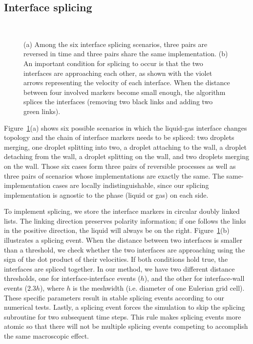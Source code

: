 \documentclass[%
 aip,
 amsmath,amssymb,
 reprint,
 floatfix
]{revtex4-1}
\begin{document}
\subsection{Interface splicing} \label{subsec:splice}
\begin{figure}
\centering
{}\quad
{}\\
\caption{\footnotesize{(a) Among the six interface splicing scenarios, three pairs are reversed in time and three pairs share the same implementation. (b) An important condition for splicing to occur is that the two interfaces are approaching each other, as shown with the violet arrows representing the velocity of each interface. When the distance between four involved markers become small enough, the algorithm splices the interfaces (removing two black links and adding two green links).}}
\label{fig:splice}
\end{figure}
Figure~\ref{fig:splice}(a) shows six possible scenarios in which the liquid-gas interface changes topology and the chain of interface markers needs to be spliced: two droplets merging, one droplet splitting into two, a droplet attaching to the wall, a droplet detaching from the wall, a droplet splitting on the wall, and two droplets merging on the wall. Those six cases form three pairs of reversible processes as well as three pairs of scenarios whose implementations are exactly the same. The same-implementation cases are locally indistinguishable, since our splicing implementation is agnostic to the phase (liquid or gas) on each side. 

To implement splicing, we store the interface markers in circular doubly linked lists. The linking direction preserves polarity information; if one follows the links in the positive direction, the liquid will always be on the right. Figure~\ref{fig:splice}(b) illustrates a splicing event. When the distance between two interfaces is smaller than a threshold, we check whether the two interfaces are approaching using the sign of the dot product of their velocities. If both conditions hold true, the interfaces are spliced together. In our method, we have two different distance thresholds, one for interface-interface events ($h$), and the other for interface-wall events ($2.3h$), where $h$ is the meshwidth (i.e. diameter of one Eulerian grid cell). These specific parameters result in stable splicing events according to our numerical tests. Lastly, a splicing event forces the simulation to skip the splicing subroutine for two subsequent time steps. This rule makes splicing events more atomic so that there will not be multiple splicing events competing to accomplish the same macroscopic effect.
\end{document}
